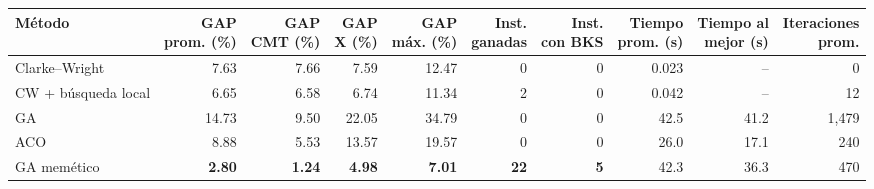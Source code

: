 \begin{tabular}{lrrrrrrrrr}
\toprule
Método & \makecell{GAP\\prom. (\%)} & \makecell{GAP\\CMT (\%)} & \makecell{GAP\\X (\%)} & \makecell{GAP\\máx. (\%)} & \makecell{Inst.\\ganadas} & \makecell{Inst.\\con BKS} & \makecell{Tiempo\\prom. (s)} & \makecell{Tiempo al\\mejor (s)} & \makecell{Iteraciones\\prom.} \\
\midrule
Clarke--Wright & 7.63 & 7.66 & 7.59 & 12.47 & 0 & 0 & 0.023 & -- & 0 \\
CW + búsqueda local & 6.65 & 6.58 & 6.74 & 11.34 & 2 & 0 & 0.042 & -- & 12 \\
GA & 14.73 & 9.50 & 22.05 & 34.79 & 0 & 0 & 42.5 & 41.2 & 1,479 \\
ACO & 8.88 & 5.53 & 13.57 & 19.57 & 0 & 0 & 26.0 & 17.1 & 240 \\
GA memético & \textbf{2.80} & \textbf{1.24} & \textbf{4.98} & \textbf{7.01} & \textbf{22} & \textbf{5} & 42.3 & 36.3 & 470 \\
\bottomrule
\end{tabular}
